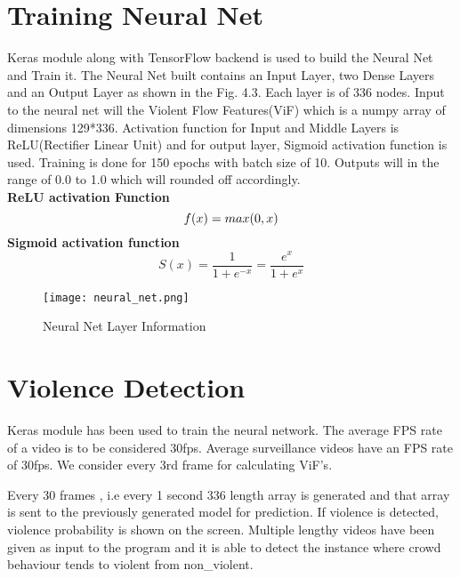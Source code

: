\section{Training Neural Net}
Keras module along with TensorFlow backend is used to build the Neural Net and Train it. The Neural Net built contains an Input Layer, two Dense Layers and an Output Layer as shown in the Fig. 4.3. Each layer is of 336 nodes. Input to the neural net will the Violent Flow Features(ViF) which is a numpy array of dimensions 129*336. Activation function for Input and Middle Layers is ReLU(Rectifier Linear Unit) and for output layer, Sigmoid activation function is used. Training is done for 150 epochs with batch size of 10. Outputs will in the range of 0.0 to 1.0 which will rounded off accordingly. \\
\textbf{ReLU activation Function} \\
\begin{equation}
f(x) = max(0,x)\\
\end{equation}
\textbf{Sigmoid activation function} \\
\begin{equation}
S(x) = \frac{1}{1+e^{-x}} = \frac{e^x}{1+e^x}
\end{equation}
\begin{center}
\begin{figure}[H]
\centering
\texttt{[image: neural\_net.png]}
\caption{Neural Net Layer Information}
\end{figure}
\end{center}
\section{Violence Detection}
Keras module has been used to train the neural network. The average FPS rate of a video is to be considered 30fps. Average surveillance videos have an FPS rate of 30fps. We consider every 3rd frame for calculating ViF’s. 
\par
	Every 30 frames , i.e every 1 second 336 length array is generated and that array is sent to the previously generated model for prediction. If violence is detected, violence probability is shown on the screen. Multiple lengthy videos have been given as input to the program and it is able to detect the instance where crowd behaviour tends to violent from non\_violent.



